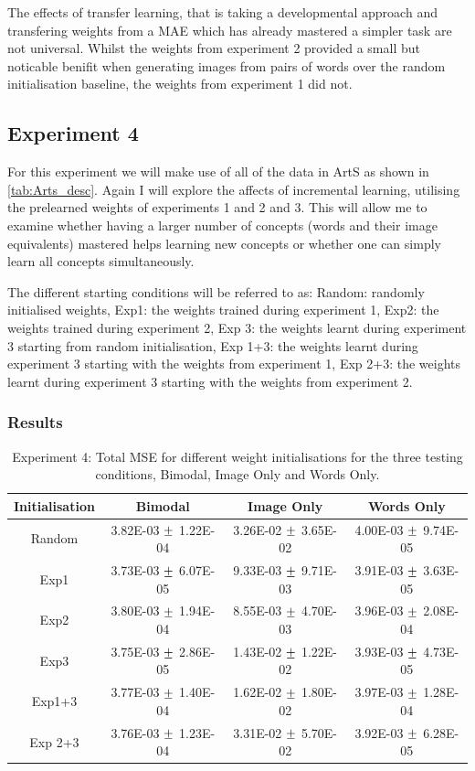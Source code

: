 The effects of transfer learning, that is taking a developmental approach and transfering weights from a MAE which has already mastered a simpler task are not universal. Whilst the weights from experiment 2 provided a small but noticable benifit when generating images from pairs of words over the random initialisation baseline, the weights from experiment 1 did not. 

\subsection{Experiment 4}
For this experiment we will make use of all of the data in ArtS as shown in \autoref{tab:Arts_desc}. Again I will explore the affects of incremental learning, utilising the prelearned weights of experiments 1 and 2 and 3. This will allow me to examine whether having a larger number of concepts (words and their image equivalents) mastered  helps learning new concepts or whether one can simply learn all concepts simultaneously.

The different starting conditions will be referred to as: Random: randomly initialised weights, Exp1: the weights trained during experiment 1, Exp2: the weights trained during experiment 2, Exp 3: the weights learnt during experiment 3 starting from random initialisation, Exp 1+3: the weights learnt during experiment 3 starting with the weights from experiment 1, Exp 2+3: the weights learnt during experiment 3 starting with the weights from experiment 2.

\subsubsection{Results}

\begin{table}[h!]
\centering
	\begin{tabular}{|c|c|c|c|}
	\hline
	Initialisation & 	Bimodal & 	Image Only 	& 	Words Only \\ \hline
Random	&	3.82E-03	$\mypm$	1.22E-04	&	3.26E-02	$\mypm$	3.65E-02	&	4.00E-03	$\mypm$	9.74E-05	\\ \hline
Exp1	&	3.73E-03	$\mypm$	6.07E-05	&	9.33E-03	$\mypm$	9.71E-03	&	3.91E-03	$\mypm$	3.63E-05	\\ \hline
Exp2	&	3.80E-03	$\mypm$	1.94E-04	&	8.55E-03	$\mypm$	4.70E-03	&	3.96E-03	$\mypm$	2.08E-04	\\ \hline
Exp3	&	3.75E-03	$\mypm$	2.86E-05	&	1.43E-02	$\mypm$	1.22E-02	&	3.93E-03	$\mypm$	4.73E-05	\\ \hline
Exp1+3	&	3.77E-03	$\mypm$	1.40E-04	&	1.62E-02	$\mypm$	1.80E-02	&	3.97E-03	$\mypm$	1.28E-04	\\ \hline
Exp 2+3	&	3.76E-03	$\mypm$	1.23E-04	&	3.31E-02	$\mypm$	5.70E-02	&	3.92E-03	$\mypm$	6.28E-05	\\ \hline



	\end{tabular}
\caption{Experiment 4: Total MSE for different weight initialisations for the three testing conditions, Bimodal, Image Only and Words Only.}
\label{tab:res739}
\end{table}

